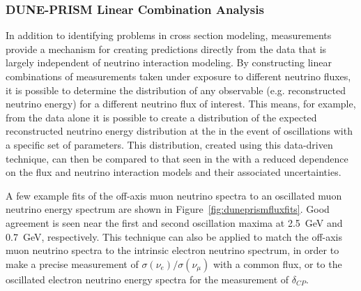 \subsubsection{DUNE-PRISM Linear Combination Analysis}

In addition to identifying problems in cross section modeling,  measurements provide a mechanism for creating   predictions directly from the   data that is largely independent of neutrino interaction modeling. By constructing linear combinations of measurements taken under exposure to different neutrino fluxes, it is possible to determine the distribution of any observable (e.g. reconstructed neutrino energy) for a different neutrino flux of interest. This means, for example, from the  data alone it is possible to create a distribution of the expected reconstructed neutrino energy distribution at the  in the event of oscillations with a specific set of parameters.  This distribution, created using this data-driven technique, can then be compared to that seen in the  with a reduced dependence on the flux and neutrino interaction models and their associated uncertainties.



A few example fits of the off-axis  muon neutrino spectra to an oscillated   muon neutrino energy spectrum are shown in Figure~\ref{fig:duneprismfluxfits}. Good agreement is seen near the first and second oscillation maxima at 2.5~GeV and 0.7~GeV, respectively. This technique can also be applied to match the off-axis muon neutrino spectra to the   intrinsic electron neutrino spectrum, in order to make a precise measurement of $\sigma(\nu_e)/\sigma(\nu_\mu)$ with a common flux, or to the   oscillated electron neutrino energy spectra for the measurement of $\delta_{CP}$.


